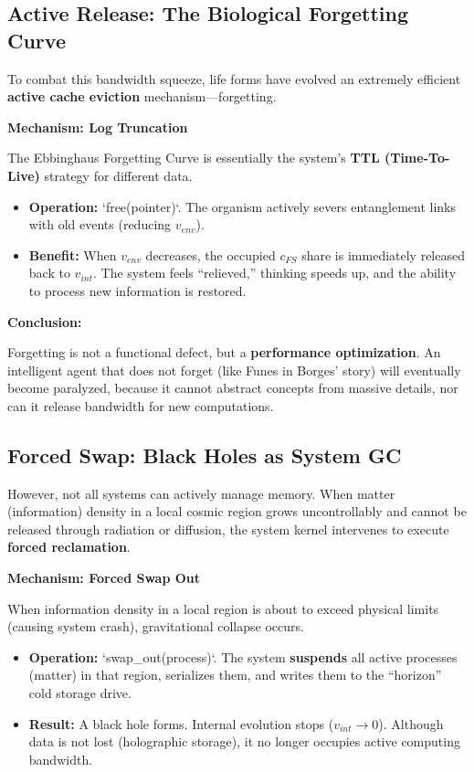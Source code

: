 \subsection{Active Release: The Biological Forgetting Curve}

To combat this bandwidth squeeze, life forms have evolved an extremely efficient \textbf{active cache eviction} mechanism---forgetting.

\textbf{Mechanism: Log Truncation}

The Ebbinghaus Forgetting Curve is essentially the system's \textbf{TTL (Time-To-Live)} strategy for different data.

\begin{itemize}
\item \textbf{Operation:} `free(pointer)`. The organism actively severs entanglement links with old events (reducing \textbf{$v_{env}$}).

\item \textbf{Benefit:} When \textbf{$v_{env}$} decreases, the occupied \textbf{$c_{FS}$} share is immediately released back to \textbf{$v_{int}$}. The system feels ``relieved,'' thinking speeds up, and the ability to process new information is restored.
\end{itemize}

\textbf{Conclusion:}

Forgetting is not a functional defect, but a \textbf{performance optimization}. An intelligent agent that does not forget (like Funes in Borges' story) will eventually become paralyzed, because it cannot abstract concepts from massive details, nor can it release bandwidth for new computations.

\subsection{Forced Swap: Black Holes as System GC}

However, not all systems can actively manage memory. When matter (information) density in a local cosmic region grows uncontrollably and cannot be released through radiation or diffusion, the system kernel intervenes to execute \textbf{forced reclamation}.

\textbf{Mechanism: Forced Swap Out}

When information density in a local region is about to exceed physical limits (causing system crash), gravitational collapse occurs.

\begin{itemize}
\item \textbf{Operation:} `swap\_out(process)`. The system \textbf{suspends} all active processes (matter) in that region, serializes them, and writes them to the ``horizon'' cold storage drive.

\item \textbf{Result:} A black hole forms. Internal evolution stops (\textbf{$v_{int} \to 0$}). Although data is not lost (holographic storage), it no longer occupies active computing bandwidth.
\end{itemize}

